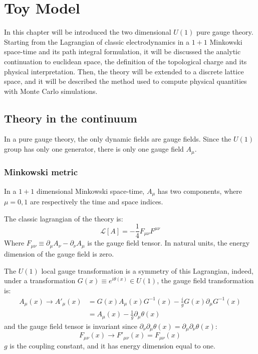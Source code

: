 \chapter{Toy Model}\label{ch:toy_model}

In this chapter will be introduced the two dimensional $U(1)$ pure gauge theory.
Starting from the Lagrangian of classic electrodynamics in a $1+1$ Minkowski space-time and its path integral formulation,
it will be discussed the analytic continuation to euclidean space, the definition of the topological charge and its physical interpretation.
Then, the theory will be extended to a discrete lattice space, and it will be described the method used to compute physical quantities with Monte Carlo simulations.


\section{Theory in the continuum}

In a pure gauge theory, the only dynamic fields are gauge fields.
Since the $U(1)$ group has only one generator, there is only one gauge field $A_\mu$.

\subsection*{Minkowski metric}

In a $1+1$ dimensional Minkowski space-time, $A_\mu$ has two components, where $\mu = 0, 1$ are respectively the time and space indices.

The classic lagrangian of the theory is:
\[
    \mathcal L[A] = -\frac{1}{4} F_{\mu\nu}F^{\mu\nu}
\]
Where $F_{\mu\nu} \equiv \partial_\mu A_\nu - \partial_\nu A_\mu$ is the gauge field tensor.
In natural units, the energy dimension of the gauge field is zero.

The $U(1)$ local gauge transformation is a symmetry of this Lagrangian, indeed,
under a transformation $G(x) \equiv e^{i\theta(x)} \in U(1)$,
the gauge field transformation is:
\begin{align*}
    A_\mu(x) \rightarrow A'_\mu(x) &= G(x) A_\mu(x) G^{-1}(x) - \frac{i}{g} G(x) \partial_\mu G^{-1}(x) \\
                                   &= A_\mu(x) - \frac{1}{g} \partial_\mu \theta(x)
\end{align*}
and the gauge field tensor is invariant since $\partial_\nu\partial_\mu\theta(x) = \partial_\mu\partial_\nu\theta(x)$:
\[
    F_{\mu\nu}(x) \rightarrow F'_{\mu\nu}(x) = F_{\mu\nu}(x)
\]
$g$ is the coupling constant, and it has energy dimension equal to one.

